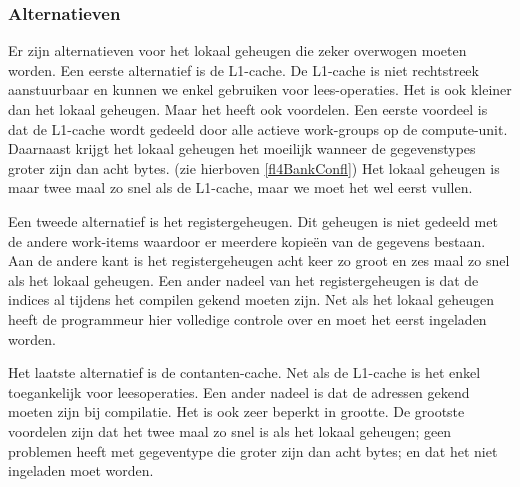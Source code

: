 \subsubsection{Alternatieven}
Er zijn alternatieven voor het lokaal geheugen die zeker overwogen moeten worden. Een eerste alternatief is de L1-cache. De L1-cache is niet rechtstreek aanstuurbaar en kunnen we enkel gebruiken voor lees-operaties. Het is ook kleiner dan het lokaal geheugen. Maar het heeft ook voordelen. Een eerste voordeel is dat de L1-cache wordt gedeeld door alle actieve work-groups op de compute-unit. Daarnaast krijgt het lokaal geheugen het moeilijk wanneer de gegevenstypes groter zijn dan acht bytes. (zie hierboven \ref{fl4BankConfl}) Het lokaal geheugen is maar twee maal zo snel als de L1-cache, maar we moet het wel eerst vullen.

Een tweede alternatief is het registergeheugen. Dit geheugen is niet gedeeld met de andere work-items waardoor er meerdere kopie\"en van de gegevens bestaan. Aan de andere kant is het registergeheugen acht keer zo groot en zes maal zo snel als het lokaal geheugen. Een ander nadeel van het registergeheugen is dat de indices al tijdens het compilen gekend moeten zijn. Net als het lokaal geheugen heeft de programmeur hier volledige controle over en moet het eerst ingeladen worden.

Het laatste alternatief is de contanten-cache. Net als de L1-cache is het enkel toegankelijk voor leesoperaties. Een ander nadeel is dat de adressen gekend moeten zijn bij compilatie. Het is ook zeer beperkt in grootte. De grootste voordelen zijn dat het twee maal zo snel is als het lokaal geheugen; geen problemen heeft met gegeventype die groter zijn dan acht bytes; en dat het niet ingeladen moet worden.